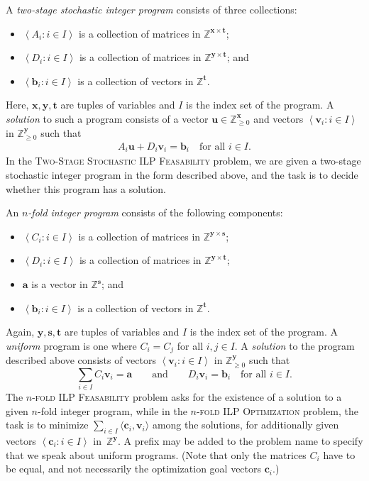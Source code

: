 \documentclass{article}
\renewcommand{\geq}{\geqslant}
\newcommand{\Z}{\mathbb{Z}}
\newcommand{\Zn}{\Z_{\geq 0}}
\newcommand{\tup}[1]{{\mathbf{#1}}}
\newcommand{\xx}{\tup x}
\newcommand{\yy}{\tup y}
\newcommand{\sv}{\tup s}
\newcommand{\tv}{\tup t}
\newcommand{\av}{\tup a}
\newcommand{\bb}{\tup b}
\newcommand{\cc}{\tup c}
\newcommand{\dd}{\tup d}
\newcommand{\uu}{\tup u}
\newcommand{\myvv}{\tup v} %
\newcommand{\matrices}[3]{#1^{#2\times #3}}
\newcommand{\mset}[1]{\left\langle #1\right\rangle}
\newcommand{\sca}[2]{\langle #1,#2\rangle}
\newcommand{\nfoldFeas}{\textsc{$n$-fold ILP Feasability}}
\newcommand{\nfoldOpt}{\textsc{$n$-fold ILP Optimization}}
\newcommand{\stageFeas}{\textsc{Two-Stage Stochastic ILP Feasability}}
\newcommand{\stageOpt}{\textsc{Two-Stage Stochastic ILP Optimization}}
\newcommand{\nfold}{$n$-fold}
\newcommand{\stage}{two-stage stochastic}
\begin{document}
A {\em{\stage{} integer program}} consists of three collections:
\begin{itemize}[nosep]
 \item $\mset{A_i\colon i\in I}$ is a collection of matrices in $\matrices{\Z}{\xx}{\tv}$;
 \item $\mset{D_i\colon i\in I}$ is a collection of matrices in $\matrices{\Z}{\yy}{\tv}$; and
 \item $\mset{\bb_i\colon i\in I}$ is a collection of vectors in $\Z^{\tv}$.
\end{itemize}
Here, $\xx,\yy,\tv$ are tuples of variables and $I$ is the index set of the program. A {\em{solution}} to such a program consists of a vector $\uu\in \Zn^\xx$ and vectors $\mset{\myvv_i\colon i\in I}$ in $\Zn^{\yy}$ such that
\begin{gather*}
A_i\uu+D_i\myvv_i = \bb_i \quad \textrm{for all }i\in I.
\end{gather*}
In the \stageFeas{} problem, we are given a \stage{} integer program in the form described above, and the task is to decide whether this program has a solution.


An {\em{\nfold{} integer program}} consists of the following components:
\begin{itemize}[nosep]
 \item $\mset{C_i\colon i\in I}$ is a collection of matrices in $\matrices{\Z}{\yy}{\sv}$;
 \item $\mset{D_i\colon i\in I}$ is a collection of matrices in $ \matrices{\Z}{\yy}{\tv}$;
 \item $\av$ is a vector in $\Z^{\sv}$; and
 \item $\mset{\bb_i\colon i\in I}$ is a collection of vectors in $\Z^{\tv}$.
\end{itemize}
Again, $\yy,\sv,\tv$ are tuples of variables and $I$ is the index set of the program. A {\em{uniform}} program is one where $C_i=C_j$ for all $i,j\in I$.
A {\em{solution}} to the program described above consists of vectors $\mset{\myvv_i\colon i\in I}$ in $\Zn^\yy$ such that
$$\sum_{i\in I}C_i\myvv_i=\av\qquad\textrm{and}\qquad D_i\myvv_i=\bb_i\quad\textrm{for all }i\in I.$$
The \nfoldFeas{} problem asks for the existence of a solution to a given \nfold{} integer program, while in the \nfoldOpt{} problem, the task is to minimize $\sum_{i\in I}\sca{\cc_i}{\myvv_i}$ among the solutions, for additionally given vectors $\mset{\cc_i\colon i\in I}$ in~$\Z^\yy$. A prefix {} may be added to the problem name to specify that we speak about uniform programs. (Note that only the matrices $C_i$ have to be equal, and not necessarily the optimization goal vectors $\cc_i$.)
\end{document}
